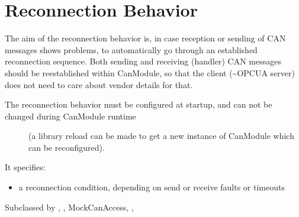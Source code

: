 \documentclass[a4paper,10pt,english]{sphinxmanual}
\begin{document}
\chapter{Reconnection Behavior}
\label{\detokenize{reconnection:reconnection-behavior}}\label{\detokenize{reconnection::doc}}
\sphinxAtStartPar
The aim of the reconnection behavior is, in case reception or sending of CAN messages shows problems,
to automatically go through an established reconnection sequence. Both sending and receiving (handler)
CAN messages should be reestablished within CanModule, so that the client (\textasciitilde{}OPCUA server) does not
need to care about vendor details for that.
\begin{description}
\item[{The reconnection behavior must be configured at startup, and can not be changed during CanModule runtime}] \leavevmode
\sphinxAtStartPar
(a library reload can be made to get a new instance of CanModule which can be re\sphinxhyphen{}configured).

\end{description}

\sphinxAtStartPar
It specifies:
\begin{itemize}
\item {} 
\sphinxAtStartPar
a reconnection condition, depending on send or receive faults or timeouts

\end{itemize}

\begin{fulllineitems}
\label{\detokenize{reconnection:_CPPv4N9CanModule10CCanAccessE}}%
\pysigstartmultiline
{}%
\pysigstopmultiline
\sphinxAtStartPar
Subclassed by {\hyperref[\detokenize{classestracing:classAnaCanScan}]{}}, {\hyperref[\detokenize{vendors/systec:classCSockCanScan}]{}}, MockCanAccess, {\hyperref[\detokenize{vendors/peak:classPKCanScan}]{}}, {\hyperref[\detokenize{classestracing:classSTCanScan}]{}}

\end{fulllineitems}
\end{document}

